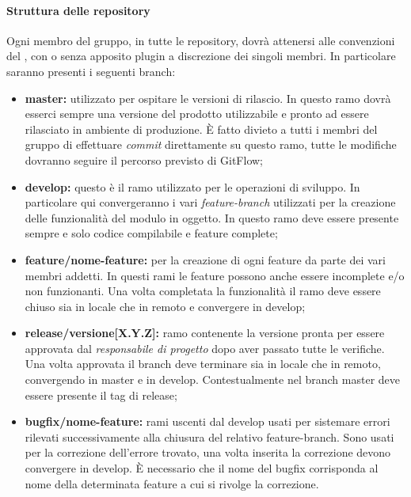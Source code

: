 \paragraph{Struttura delle repository}
Ogni membro del gruppo, in tutte le repository, dovrà attenersi alle convenzioni del , con o senza apposito plugin a discrezione dei singoli membri.
In particolare saranno presenti i seguenti branch:
\begin{itemize}
    \item \textbf{master:} utilizzato per ospitare le versioni di rilascio. In questo ramo dovrà esserci sempre una versione del prodotto utilizzabile
                           e pronto ad essere rilasciato in ambiente di produzione. È fatto divieto a tutti i membri del gruppo di effettuare \textit{commit}
                           direttamente su questo ramo, tutte le modifiche dovranno seguire il percorso previsto di GitFlow;
    \item \textbf{develop:} questo è il ramo utilizzato per le operazioni di sviluppo. In particolare qui convergeranno i vari \textit{feature-branch}
                            utilizzati per la creazione delle funzionalità del modulo in oggetto. In questo ramo deve essere presente sempre e solo codice
                            compilabile e feature complete;
    \item \textbf{feature/nome-feature:} per la creazione di ogni feature da parte dei vari membri addetti. In questi rami le feature possono anche essere
                                         incomplete e/o non funzionanti. Una volta completata la funzionalità il ramo deve essere chiuso sia in locale che in remoto e 
                                         convergere in develop;
    \item \textbf{release/versione[X.Y.Z]:} ramo contenente la versione  pronta per essere approvata dal \textit{responsabile di progetto} dopo
                                            aver passato tutte le verifiche. Una volta approvata il branch deve terminare sia in locale che in remoto, convergendo in master e in develop.
                                            Contestualmente nel branch master deve essere presente il tag di release;
    \item \textbf{bugfix/nome-feature:} rami uscenti dal develop usati per sistemare errori rilevati successivamente alla chiusura del relativo feature-branch.
                                       Sono usati per la correzione dell'errore trovato, una volta inserita la correzione devono convergere in develop. È necessario
                                       che il nome del bugfix corrisponda al nome della determinata feature a cui si rivolge la correzione.
\end{itemize}
